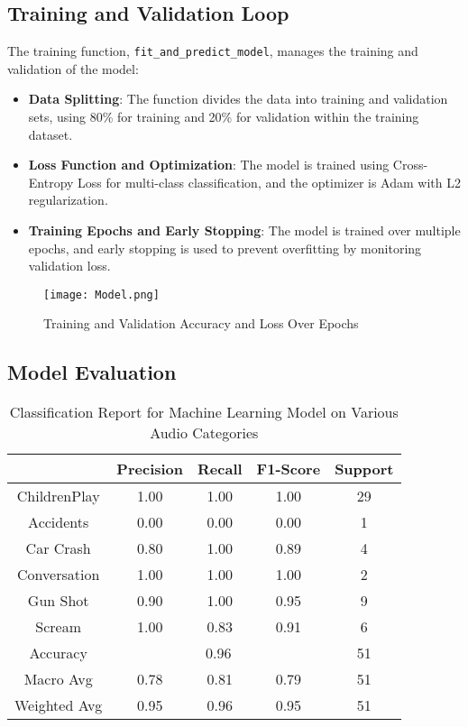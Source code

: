 \documentclass[conference]{IEEEtran}
\begin{document}
\subsection{Training and Validation Loop}
The training function, \texttt{fit\_and\_predict\_model}, manages the training and validation of the model:
\begin{itemize}
    \item \textbf{Data Splitting}: The function divides the data into training and validation sets, using 80\% for training and 20\% for validation within the training dataset.
    \item \textbf{Loss Function and Optimization}: The model is trained using Cross-Entropy Loss for multi-class classification, and the optimizer is Adam with L2 regularization.
    \item \textbf{Training Epochs and Early Stopping}: The model is trained over multiple epochs, and early stopping is used to prevent overfitting by monitoring validation loss.
\end{itemize}

\begin{figure}[h!]
    \centering
    \texttt{[image: Model.png]}
    \caption{Training and Validation Accuracy and Loss Over Epochs}
    \label{fig:loss_plot}
\end{figure}

\subsection{Model Evaluation}
\begin{table}[h!]
    \centering
    \caption{Classification Report for Machine Learning Model on Various Audio Categories}
    \begin{tabular}{|c|c|c|c|c|}
        \hline
        & \textbf{Precision} & \textbf{Recall} & \textbf{F1-Score} & \textbf{Support} \\
        \hline
        ChildrenPlay & 1.00 & 1.00 & 1.00 & 29 \\
        Accidents & 0.00 & 0.00 & 0.00 & 1 \\
        Car Crash & 0.80 & 1.00 & 0.89 & 4 \\
        Conversation & 1.00 & 1.00 & 1.00 & 2 \\
        Gun Shot & 0.90 & 1.00 & 0.95 & 9 \\
        Scream & 1.00 & 0.83 & 0.91 & 6 \\
        \hline
        Accuracy & \multicolumn{3}{c|}{0.96} & 51 \\
        \hline
        Macro Avg & 0.78 & 0.81 & 0.79 & 51 \\
        Weighted Avg & 0.95 & 0.96 & 0.95 & 51 \\
        \hline
    \end{tabular}
    \label{tab:classification_report}
\end{table}
\end{document}
